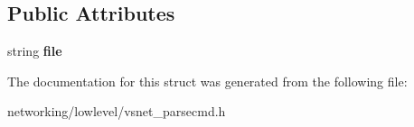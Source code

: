 \subsection*{Public Attributes}
\begin{DoxyCompactItemize}
\item 
string {\bfseries file}\hypertarget{structVsnetDownload_1_1Adapter_1_1DownloadError_a9b45e67d4d28d4fa5fb8d0de3c45f265}{}\label{structVsnetDownload_1_1Adapter_1_1DownloadError_a9b45e67d4d28d4fa5fb8d0de3c45f265}

\end{DoxyCompactItemize}


The documentation for this struct was generated from the following file\+:\begin{DoxyCompactItemize}
\item 
networking/lowlevel/vsnet\+\_\+parsecmd.\+h\end{DoxyCompactItemize}
